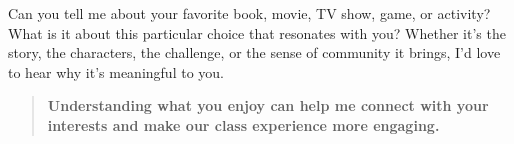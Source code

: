 \documentclass{ximera}
\author{Bart Snapp}
\begin{document}
\begin{question}
    Can you tell me about your favorite book, movie, TV show, game, or activity?
    What is it about this particular choice that resonates with you? Whether it's
    the story, the characters, the challenge, or the sense of community it brings,
    I'd love to hear why it's meaningful to you. 
    
    
    \begin{quote}
    \textbf{Understanding what you enjoy can
    help me connect with your interests and make our class experience more
    engaging.}
    \end{quote}
    \begin{freeResponse}
    \end{freeResponse}
\end{question}
\end{document}
